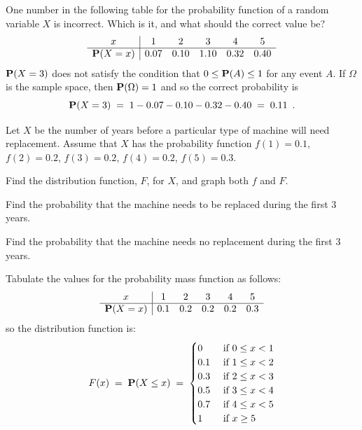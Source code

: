 \begin{ExerciseList}
\Exercise
One number in the following table for the probability function of a random variable $X$ is incorrect.  
Which is it, and what should the correct value be?
$$
\begin{array}{c|ccccc}
x&1&2&3&4&5\\\hline
\mathbf{P}(X=x)&0.07&0.10&1.10&0.32&0.40
\end{array}
$$
\Answer
$\mathbf{P}(X=3)$ does not satisfy the condition that $0\leq \mathbf{P}(A)\leq1$ for any event $A$.  
If $\Omega$ is the sample space, then $\mathbf{P}(\Omega)=1$ and so  the correct probability is 
\[
\mathbf{P}(X=3)\;=\;1-0.07-0.10-0.32-0.40\;=\;0.11 \enspace .
\]

\Exercise
Let $X$ be the number of years before a particular type of machine will need replacement.  
Assume that $X$ has the probability function $f(1)=0.1$, $f(2)=0.2$, $f(3)=0.2$, $f(4)=0.2$, $f(5)=0.3$.
\be
\item Find the distribution
  function, $F$,  for $X$, and graph both $f$ and $F$.

\item  Find the probability that the machine needs to be
  replaced during the first 3 years.

\item  Find the probability that the machine needs no
  replacement during the first 3 years.
\ee
\Answer
\be
\item  Tabulate the values for the probability mass function  as follows: $$
\begin{array}{c|ccccc}
x&1&2&3&4&5\\\hline
\mathbf{P}(X=x)&0.1&0.2&0.2&0.2&0.3
\end{array}
$$so the  distribution function is:
\[F(x)\; = \;\mathbf{P}(X \leq x) \;=\;
\begin{cases}
 0 & \text{ if }  0 \leq   x < 1\\
 0.1 & \text{ if } 1 \leq  x < 2\\
0.3 & \text{ if } 2 \leq x < 3\\
 0.5 & \text{ if } 3 \leq x < 4\\
0.7 & \text{ if }  4 \leq x < 5\\
 1& \text{ if }    x \geq 5
\end{cases}
\]






\end{ExerciseList}
